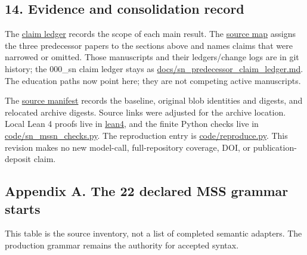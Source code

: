 \documentclass[
  11pt,
]{article}
\begin{document}
\subsection{14. Evidence and consolidation
record}\label{evidence-and-consolidation-record}

The \href{paper_claim_ledger.md}{claim ledger} records the scope of each
main result. The \href{source_map.md}{source map} assigns the three
predecessor papers to the sections above and names claims that were
narrowed or omitted. Those manuscripts and their
ledgers/change logs are in git history; the 000\_sn claim ledger stays as
\href{docs/sn_predecessor_claim_ledger.md}{docs/sn\_predecessor\_claim\_ledger.md}. The education
paths now point here; they are not competing active manuscripts.

The \href{source_provenance.json}{source manifest} records the baseline,
original blob identities and digests, and relocated archive digests.
Source links were adjusted for the archive location. Local Lean 4 proofs
live in \href{lean4/Paper001.lean}{lean4}, and the finite Python checks
live in \url{code/sn_mssn_checks.py}. The reproduction entry is
\url{code/reproduce.py}. This revision makes no new model-call,
full-repository coverage, DOI, or publication-deposit claim.

\subsection{Appendix A. The 22 declared MSS grammar
starts}\label{appendix-a.-the-22-declared-mss-grammar-starts}

This table is the source inventory, not a list of completed semantic
adapters. The production grammar remains the authority for accepted
syntax.
\end{document}
